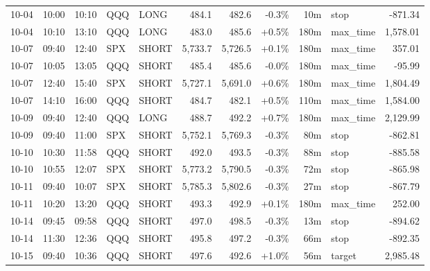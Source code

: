 \documentclass[11pt,a4paper,twoside]{article}
\begin{document}
\begin{center}
\begin{longtable}{>{\color{txtmain}}l l l l l r r r r >{\color{txtmain}}l r}
10-04 & 10:00 & 10:10 & QQQ & LONG & 484.1 & 482.6 & \textcolor{lossred}{-0.3\%} & 10m & stop & \textcolor{lossred}{-871.34} \\
10-04 & 10:10 & 13:10 & QQQ & LONG & 483.0 & 485.6 & \textcolor{wingreen}{+0.5\%} & 180m & max\_time & \textcolor{wingreen}{1,578.01} \\
10-07 & 09:40 & 12:40 & SPX & SHORT & 5,733.7 & 5,726.5 & \textcolor{wingreen}{+0.1\%} & 180m & max\_time & \textcolor{wingreen}{357.01} \\
10-07 & 10:05 & 13:05 & QQQ & SHORT & 485.4 & 485.6 & \textcolor{lossred}{-0.0\%} & 180m & max\_time & \textcolor{lossred}{-95.99} \\
10-07 & 12:40 & 15:40 & SPX & SHORT & 5,727.1 & 5,691.0 & \textcolor{wingreen}{+0.6\%} & 180m & max\_time & \textcolor{wingreen}{1,804.49} \\
10-07 & 14:10 & 16:00 & QQQ & SHORT & 484.7 & 482.1 & \textcolor{wingreen}{+0.5\%} & 110m & max\_time & \textcolor{wingreen}{1,584.00} \\
10-09 & 09:40 & 12:40 & QQQ & LONG & 488.7 & 492.2 & \textcolor{wingreen}{+0.7\%} & 180m & max\_time & \textcolor{wingreen}{2,129.99} \\
10-09 & 09:40 & 11:00 & SPX & SHORT & 5,752.1 & 5,769.3 & \textcolor{lossred}{-0.3\%} & 80m & stop & \textcolor{lossred}{-862.81} \\
10-10 & 10:30 & 11:58 & QQQ & SHORT & 492.0 & 493.5 & \textcolor{lossred}{-0.3\%} & 88m & stop & \textcolor{lossred}{-885.58} \\
10-10 & 10:55 & 12:07 & SPX & SHORT & 5,773.2 & 5,790.5 & \textcolor{lossred}{-0.3\%} & 72m & stop & \textcolor{lossred}{-865.98} \\
10-11 & 09:40 & 10:07 & SPX & SHORT & 5,785.3 & 5,802.6 & \textcolor{lossred}{-0.3\%} & 27m & stop & \textcolor{lossred}{-867.79} \\
10-11 & 10:20 & 13:20 & QQQ & SHORT & 493.3 & 492.9 & \textcolor{wingreen}{+0.1\%} & 180m & max\_time & \textcolor{wingreen}{252.00} \\
10-14 & 09:45 & 09:58 & QQQ & SHORT & 497.0 & 498.5 & \textcolor{lossred}{-0.3\%} & 13m & stop & \textcolor{lossred}{-894.62} \\
10-14 & 11:30 & 12:36 & QQQ & SHORT & 495.8 & 497.2 & \textcolor{lossred}{-0.3\%} & 66m & stop & \textcolor{lossred}{-892.35} \\
10-15 & 09:40 & 10:36 & QQQ & SHORT & 497.6 & 492.6 & \textcolor{wingreen}{+1.0\%} & 56m & target & \textcolor{wingreen}{2,985.48} \\

\end{longtable}
\end{center}
\end{document}
